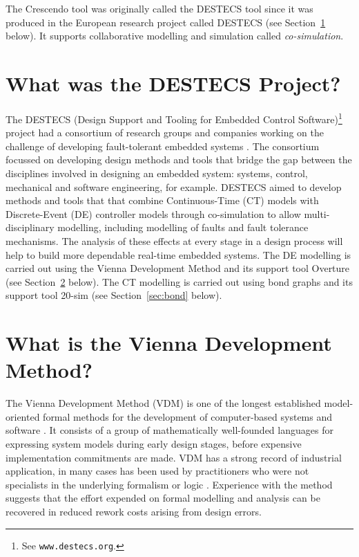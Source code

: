 \documentclass{crescendorepchap}
\newcommand{\url}[1]{\texttt{#1}}
\begin{document}
The Crescendo tool was originally called the DESTECS tool since it was produced in the European research project called DESTECS (see Section~\ref{sec:destecs} below). It supports collaborative modelling and simulation called \emph{co-simulation}. 

\section{What was the DESTECS Project?}\label{sec:destecs}

The DESTECS (Design Support and Tooling for Embedded Control
Software)\footnote{See \url{www.destecs.org}.} project had a
consortium of research groups and companies working on the challenge
of developing fault-tolerant embedded systems \cite{Broenink&10}. The
consortium focussed on developing design methods and tools that
bridge the gap between the disciplines involved in designing an
embedded system: systems, control, mechanical and software
engineering, for example.  DESTECS aimed to develop methods and tools
that that combine Continuous-Time (CT) models with Discrete-Event (DE)
controller models through co-simulation to allow multi-disciplinary
modelling, including modelling of faults and fault tolerance
mechanisms. The analysis of these effects at every stage in a design
process will help to build more dependable real-time embedded systems. The DE modelling is carried out using the Vienna Development Method and its support tool Overture (see Section~\ref{sec:vdm} below). The CT modelling is carried out using bond graphs and its support tool 20-sim (see Section~\ref{sec:bond} below).

\section{What is the Vienna Development Method?} \label{sec:vdm}

The Vienna Development Method (VDM) is one of the longest established
model-oriented formal methods for the development of computer-based
systems and software
\cite{Bjorner&78,Jones90a,Fitzgerald&08c}. It consists of a
group of mathematically well-founded languages for expressing system
models during early design stages, before expensive implementation
commitments are made. VDM has a strong record of industrial
application, in many cases has been used
by practitioners who were not specialists in
the underlying formalism or logic
\cite{Larsen&96b,Clement&99,Kurita&09}. Experience with the method
suggests that the effort expended on formal modelling and analysis can
be recovered in reduced rework costs arising from design errors.
\end{document}
